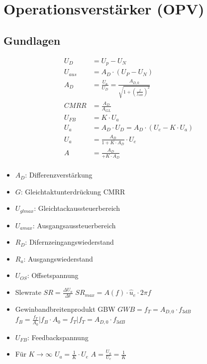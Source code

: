 \documentclass{article}
\begin{document}
\section*{Operationsverstärker (OPV)}
\begin{minipage}[t]{0.49\textwidth}
\subsection*{Gundlagen}
\begin{align*}
    U_D &= U_p-U_N\\
    U_{aus} &= A_D \cdot(U_P-U_N)\\
    A_D &= \frac{U_a}{U_D} = \frac{A_{D,0}}{\sqrt{1+(\frac{f}{f_{3dB}})^2}}\\
    CMRR &= \frac{A_D}{A_{GL}}\\
    U_{FB} &= K\cdot U_a\\
    U_a &= A_D\cdot U_D = A_D\cdot(U_e-K\cdot U_a)\\
    U_a &= \frac{A_D}{1+K\cdot A_D}\cdot U_e\\
    A &= \frac{A_D}{+K\cdot A_D}\\ 
\end{align*}
\end{minipage}
\begin{minipage}[t]{0.49\textwidth}
\begin{itemize}
    \item $A_D$: Differenzverstärkung
    \item $G$: Gleichtaktunterdrückung CMRR
    \item $U_{glmax}$: Gleichtackaussteuerbereich
    \item $U_{amax}$: Ausgangsaussteuerbereich
    \item $R_D$: Difernzeingangswiederstand
    \item $R_a$: Ausgangswiederstand
    \item $U_{OS}$: Offsetspannung
    \item Slewrate
    \subitem $SR = \frac{\Delta U_a}{\Delta t}$
    \subitem $SR_{max}=A(f)\cdot \hat{u}_e\cdot 2\pi f$
    \item Gewinbandbreitenprodukt GBW
    \subitem $GWB = f_T=A_{D,0}\cdot f_{3dB}$
    \subitem $f_B=\frac{f_T}{A_0}|f_B\cdot A_0= f_T|f_T=A_{D,0}\cdot f_{3dB}$
    \item $U_{FB}$: Feedbackspannung
    \item Für $K\rightarrow \infty$
    \subitem $U_a = \frac1{K}\cdot U_e$
    \subitem $A =\frac{U_a}{U_e}= \frac1{K}$
\end{itemize}
\end{minipage}
\end{document}
